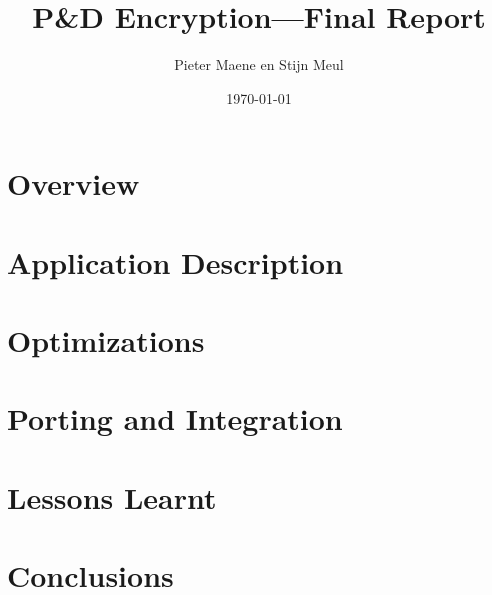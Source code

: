 \documentclass[a4paper]{article}
\title{P\&D Encryption---Final Report}
\author{Pieter Maene en Stijn Meul}
\date{\today}
\begin{document}
\maketitle

\section{Overview}

\section{Application Description}

\section{Optimizations}

\section{Porting and Integration}

\section{Lessons Learnt}

\section{Conclusions}
\end{document}
